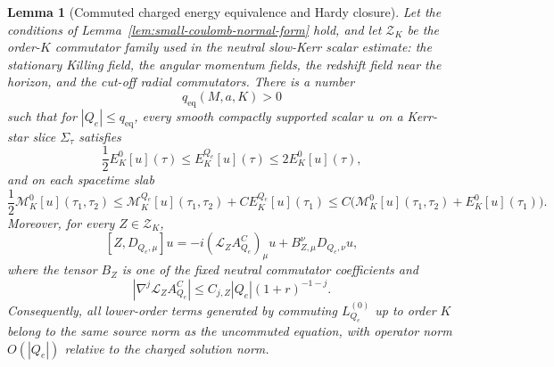 \documentclass[11pt]{article}
\numberwithin{equation}{section}
\theoremstyle{plain}
\newtheorem{lemma}[theorem]{Lemma}
\theoremstyle{definition}
\theoremstyle{remark}
\begin{document}
\begin{lemma}[Commuted charged energy equivalence and Hardy closure]\label{lem:small-coulomb-commuted-equivalence}
Let the conditions of Lemma~\ref{lem:small-coulomb-normal-form} hold, and let \(\mathcal Z_K\) be the order-\(K\) commutator family used in the neutral slow-Kerr scalar estimate: the stationary Killing field, the angular momentum fields, the redshift field near the horizon, and the cut-off radial commutators.  There is a number
\begin{equation}\label{eq:q-equivalence-threshold}
 q_{\mathrm{eq}}(M,a,K)>0
\end{equation}
such that for \(|Q_e|\le q_{\mathrm{eq}}\), every smooth compactly supported scalar \(u\) on a Kerr-star slice \(\Sigma_\tau\) satisfies
\begin{equation}\label{eq:charged-neutral-energy-equivalence}
 \frac12 E^{0}_K[u](\tau)
 \le E^{Q_e}_K[u](\tau)
 \le 2E^{0}_K[u](\tau),
\end{equation}
and on each spacetime slab
\begin{equation}\label{eq:charged-neutral-morawetz-equivalence}
 \frac12\mathcal M^0_K[u](\tau_1,\tau_2)
 \le \mathcal M^{Q_e}_K[u](\tau_1,\tau_2)+C E^{Q_e}_K[u](\tau_1)
 \le C\bigl(\mathcal M^0_K[u](\tau_1,\tau_2)+E^0_K[u](\tau_1)\bigr).
\end{equation}
Moreover, for every \(Z\in\mathcal Z_K\),
\begin{equation}\label{eq:charged-commutator-bound}
 [Z,D_{Q_e,\mu}]u=-i(\mathcal L_ZA^C_{Q_e})_\mu u + B_{Z,\mu}^{\nu}D_{Q_e,\nu}u,
\end{equation}
where the tensor \(B_Z\) is one of the fixed neutral commutator coefficients and
\begin{equation}\label{eq:Lie-Coulomb-bound}
 |\nabla^j\mathcal L_ZA^C_{Q_e}|\le C_{j,Z}|Q_e|(1+r)^{-1-j}.
\end{equation}
Consequently, all lower-order terms generated by commuting \(L_{Q_e}^{(0)}\) up to order \(K\) belong to the same source norm as the uncommuted equation, with operator norm \(O(|Q_e|)\) relative to the charged solution norm.
\end{lemma}
\end{document}
